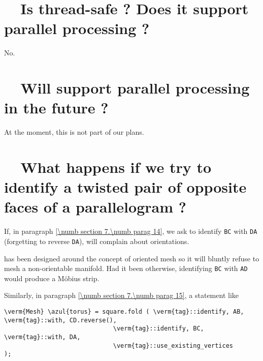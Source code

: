 \section{~~Is {\maniFEM} thread-safe ? Does it support parallel processing ?}
\label{\numb section 13.\numb parag 3}

No.


\section{~~Will {\maniFEM} support parallel processing in the future ?}
\label{\numb section 13.\numb parag 4}

At the moment, this is not part of our plans.


\section{~~What happens if we try to identify a twisted pair of
           opposite faces of a parallelogram ?}
\label{\numb section 13.\numb parag 5}

If, in paragraph \ref{\numb section 7.\numb parag 14}, we ask {\maniFEM} to identify
{\small\tt BC} with {\small\tt DA} (forgetting to reverse {\small\tt DA}),
{\maniFEM} will complain about orientations.

\ManiFEM{} has been designed around the concept of oriented mesh so it will
bluntly refuse to mesh a non-orientable manifold.
Had it been otherwise, identifying {\small\tt BC} with {\small\tt AD}
would produce a M\"obius strip.

Similarly, in paragraph \ref{\numb section 7.\numb parag 15}, a statement like

\begin{Verbatim}[commandchars=\\\{\},formatcom=\small\tt,
   baselinestretch=0.94,framesep=2mm                     ]
   \verm{Mesh} \azul{torus} = square.fold ( \verm{tag}::identify, AB, \verm{tag}::with, CD.reverse(),
                              \verm{tag}::identify, BC, \verm{tag}::with, DA,
                              \verm{tag}::use_existing_vertices                 );
\end{Verbatim}

